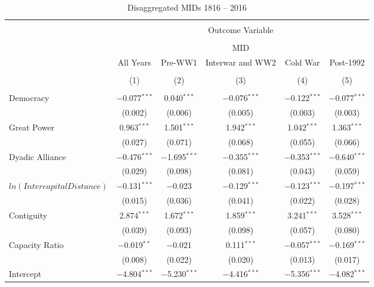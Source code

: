 
\begin{table}[!htbp] \centering 
  \caption{Disaggregated MIDs 1816 -- 2016 \footnotemark} 
  \label{} 
\tiny 
\begin{tabular}{@{\extracolsep{5pt}}lccccc} 
\\[-1.8ex]\hline 
\hline \\[-1.8ex] 
 & \multicolumn{5}{c}{Outcome Variable} \\ 
\cline{2-6} 
\\[-1.8ex] & \multicolumn{5}{c}{MID} \\ 
 & All Years & Pre-WW1 & Interwar and WW2 & Cold War & Post-1992 \\ 
\\[-1.8ex] & (1) & (2) & (3) & (4) & (5)\\ 
\hline \\[-1.8ex] 
 Democracy & $-$0.077$^{***}$ & 0.040$^{***}$ & $-$0.076$^{***}$ & $-$0.122$^{***}$ & $-$0.077$^{***}$ \\ 
  & (0.002) & (0.006) & (0.005) & (0.003) & (0.003) \\ 
  Great Power & 0.963$^{***}$ & 1.501$^{***}$ & 1.942$^{***}$ & 1.042$^{***}$ & 1.363$^{***}$ \\ 
  & (0.027) & (0.071) & (0.068) & (0.055) & (0.066) \\ 
  Dyadic Alliance & $-$0.476$^{***}$ & $-$1.695$^{***}$ & $-$0.355$^{***}$ & $-$0.353$^{***}$ & $-$0.640$^{***}$ \\ 
  & (0.029) & (0.098) & (0.081) & (0.043) & (0.059) \\ 
  $ln(Intercapital Distance)$ & $-$0.131$^{***}$ & $-$0.023 & $-$0.129$^{***}$ & $-$0.123$^{***}$ & $-$0.197$^{***}$ \\ 
  & (0.015) & (0.036) & (0.041) & (0.022) & (0.028) \\ 
  Contiguity & 2.874$^{***}$ & 1.672$^{***}$ & 1.859$^{***}$ & 3.241$^{***}$ & 3.528$^{***}$ \\ 
  & (0.039) & (0.093) & (0.098) & (0.057) & (0.080) \\ 
  Capacity Ratio & $-$0.019$^{**}$ & $-$0.021 & 0.111$^{***}$ & $-$0.057$^{***}$ & $-$0.169$^{***}$ \\ 
  & (0.008) & (0.022) & (0.020) & (0.013) & (0.017) \\ 
  Intercept & $-$4.804$^{***}$ & $-$5.230$^{***}$ & $-$4.416$^{***}$ & $-$5.356$^{***}$ & $-$4.082$^{***}$ \\ 

\end{tabular}
\end{table}
